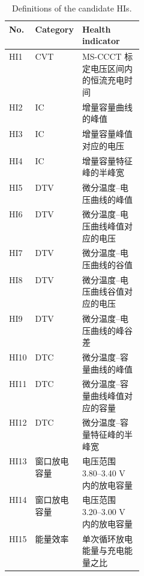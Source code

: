 \documentclass[UTF8,11pt]{ctexart}
\begin{document}
\setcounter{table}{1}
\begin{table}[H]
\caption{Definitions of the candidate HIs.}
\centering
{}
\setlength{\tabcolsep}{2.1pt}
\renewcommand{\arraystretch}{1.10}
\begin{ThreePartTable}
\begin{tabularx}{0.98\linewidth}{
>{\centering\arraybackslash}p{0.08\linewidth}
>{\centering\arraybackslash}p{0.18\linewidth}
>{\raggedright\arraybackslash}X}
\toprule
No. & Category & Health indicator \\
\midrule
HI1 & CVT & MS-CCCT 标定电压区间内的恒流充电时间 \\
HI2 & IC & 增量容量曲线的峰值 \\
HI3 & IC & 增量容量峰值对应的电压 \\
HI4 & IC & 增量容量特征峰的半峰宽 \\
HI5 & DTV & 微分温度--电压曲线的峰值 \\
HI6 & DTV & 微分温度--电压曲线峰值对应的电压 \\
HI7 & DTV & 微分温度--电压曲线的谷值 \\
HI8 & DTV & 微分温度--电压曲线谷值对应的电压 \\
HI9 & DTV & 微分温度--电压曲线的峰谷差 \\
HI10 & DTC & 微分温度--容量曲线的峰值 \\
HI11 & DTC & 微分温度--容量曲线峰值对应的容量 \\
HI12 & DTC & 微分温度--容量特征峰的半峰宽 \\
HI13 & 窗口放电容量 & 电压范围 3.80--3.40 V 内的放电容量 \\
HI14 & 窗口放电容量 & 电压范围 3.20--3.00 V 内的放电容量 \\
HI15 & 能量效率 & 单次循环放电能量与充电能量之比 \\
\bottomrule
\end{tabularx}
\end{ThreePartTable}
\end{table}
\end{document}
